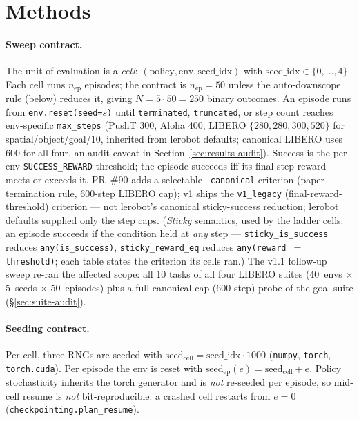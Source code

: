 \documentclass[10pt]{article}
\begin{document}

\section{Methods}
\label{sec:methods}

\paragraph{Sweep contract.}
The unit of evaluation is a \textit{cell}:
$(\text{policy}, \text{env}, \text{seed\_idx})$ with
$\text{seed\_idx} \in \{0,\ldots,4\}$. Each cell runs $n_\text{ep}$
episodes; the contract is $n_\text{ep}{=}50$ unless the auto-downscope
rule (below) reduces it, giving $N = 5 \cdot 50 = 250$ binary outcomes.
An episode runs from \texttt{env.reset(seed=$s$)} until
\texttt{terminated}, \texttt{truncated}, or step count reaches
env-specific \texttt{max\_steps} (PushT 300, Aloha 400, LIBERO
$\{280,280,300,520\}$ for spatial/object/goal/10, inherited from
lerobot defaults; canonical LIBERO uses 600 for all four, an audit
caveat in Section~\ref{sec:results-audit}). Success is the per-env
\texttt{SUCCESS\_REWARD} threshold; the episode succeeds iff its
final-step reward meets or exceeds it. PR~\#90 adds a selectable
\texttt{--canonical} criterion (paper termination rule, 600-step LIBERO
cap); v1 ships the \texttt{v1\_legacy} (final-reward-threshold)
criterion --- not lerobot's canonical sticky-success reduction; lerobot
defaults supplied only the step caps. (\emph{Sticky} semantics, used by
the ladder cells: an episode succeeds if the condition held at \emph{any}
step --- \texttt{sticky\_is\_success} reduces \texttt{any(is\_success)},
\texttt{sticky\_reward\_eq} reduces
\texttt{any(reward\,${=}$\,threshold)}; each table states the criterion
its cells ran.) The v1.1 follow-up sweep re-ran the
affected scope: all 10 tasks of all four LIBERO suites
($40$~envs $\times$ 5~seeds $\times$ 50~episodes) plus a full
canonical-cap (600-step) probe of the goal suite
(\S\ref{sec:suite-audit}).

\paragraph{Seeding contract.}
Per cell, three RNGs are seeded with
$\text{seed}_\text{cell} = \text{seed\_idx} \cdot 1000$
(\texttt{numpy}, \texttt{torch}, \texttt{torch.cuda}). Per episode the
env is reset with $\text{seed}_\text{ep}(e) = \text{seed}_\text{cell}+e$.
Policy stochasticity inherits the torch generator and is \emph{not}
re-seeded per episode, so mid-cell resume is \emph{not} bit-reproducible:
a crashed cell restarts from $e{=}0$
(\texttt{checkpointing.plan\_resume}).
\end{document}
